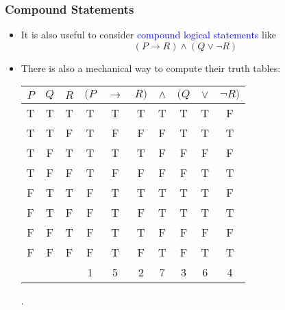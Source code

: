 \documentclass[10pt,english]{beamer}
\begin{document}
  
\begin{frame} \frametitle{Compound Statements}
  

\begin{itemize}
\setlength\itemsep{2mm}
\item It is also useful to consider \textcolor{blue}{compound logical statements} like $$(P \rightarrow R) \wedge (Q \vee \neg R)$$

\item There is also a mechanical way to compute their truth tables: \\
\begin{center}
\begin{tabular}{|c|c|c|ccccccc|}
\hline
$P$ & $Q$ & $R$
& $(P$ & $\rightarrow$ & $R)$ & $\wedge$ & $(Q$ & $\vee$ & $\neg R)$ \\
\hline
T & T & T & T & T & T & T & T & T & F \\
T & T & F & T & F & F & F & T & T & T \\
T & F & T & T & T & T & F & F & F & F \\
T & F & F & T & F & F & F & F & T & T \\
F & T & T & F & T & T & T & T & T & F \\
F & T & F & F & T & F & T & T & T & T \\
F & F & T & F & T & T & F & F & F & F \\
F & F & F & F & T & F & T & F & T & T \\
& & & 1 & 5 & 2 & 7 & 3 & 6 & 4 \\
\hline
\end{tabular} .
\end{center}

\end{itemize}


\end{frame}
\end{document}
